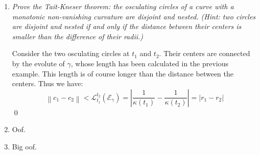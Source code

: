 \documentclass[a4paper,11pt,notitlepage,fullpage]{article}
\begin{document}
\begin{enumerate}
Therefore the involute of the evolute is indeed a parallel curve with the distance being the radius of the osculation circle in the starting point of the evolute. \qed

\item \emph{Prove the Tait-Kneser theorem: the osculating circles of a curve with a monotonic non-vanishing curvature are disjoint and nested. (\emph{Hint:} two circles are disjoint and nested if and only if the distance between their centers is smaller than the difference of their radii.)}

Consider the two osculating circles at $t_1$ and $t_2$. Their centers are connected by the evolute of $\gamma$, whose length has been calculated in the previous example. This length is of course longer than the distance between the centers. Thus we have:
\begin{equation*}
\left\| c_1 - c_2 \right\| < \mathcal L_{t_1}^{t_2}(\mathcal E_\gamma) = \left|\frac{1}{\kappa(t_1)} - \frac{1}{\kappa(t_2)}\right| = \left|r_1 - r_2\right|
\end{equation*}
\qed




\item Oof.


\item Big oof.






















\end{enumerate}
\end{document}
